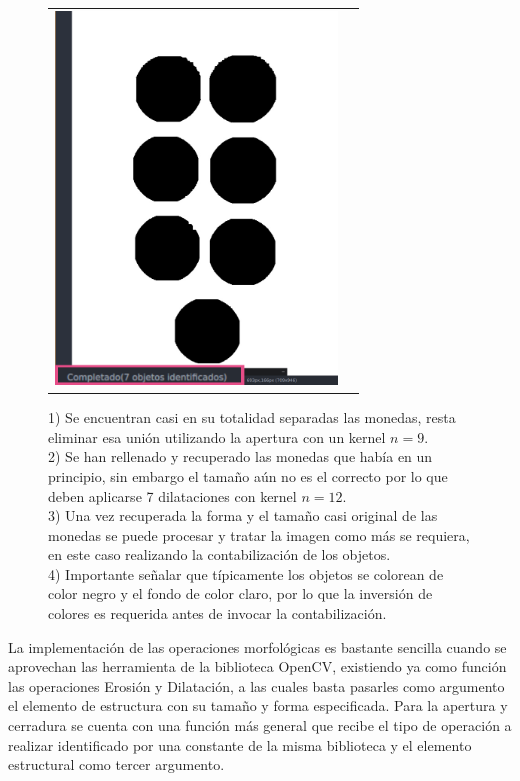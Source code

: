 \begin{figure}[!h]
\begin{tabular}{cc}
			\includegraphics[width=7.5cm]{Imagenes/op_morf_monedas_contabilizacion.png}
		\end{tabular}
		\caption{1) Se encuentran casi en su totalidad separadas las monedas, resta eliminar esa unión utilizando la apertura con un kernel $n=9$. \\ 2) Se han rellenado y recuperado las monedas que había en un principio, sin embargo el tamaño aún no es el correcto por lo que deben aplicarse 7 dilataciones con kernel $n=12$.\\ 3) Una vez recuperada la forma y el tamaño casi original de las monedas se puede procesar y tratar la imagen como más se requiera, en este caso realizando la contabilización de los objetos. \\ 4) Importante señalar que típicamente los objetos se colorean de color negro y el fondo de color claro, por lo que la inversión de colores es requerida antes de invocar la contabilización.}
	\end{figure}
	
	\newpage
	
	\hfill\break
	\justifying
	La implementación de las operaciones morfológicas es bastante sencilla cuando se aprovechan las herramienta de la biblioteca OpenCV, existiendo ya como función las operaciones Erosión y Dilatación, a las cuales basta pasarles como argumento el elemento de estructura con su tamaño y forma especificada. Para la apertura y cerradura se cuenta con una función más general que recibe el tipo de operación a realizar identificado por una constante de la misma biblioteca y el elemento estructural como tercer argumento.

